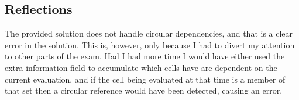 %
%

\subsection{Reflections}
The provided solution does not handle circular dependencies, and that is a
clear error in the solution. This is, however, only because I had to divert my
attention to other parts of the exam. Had I had more time I would have either
used the extra information field to accumulate which cells have are dependent
on the current evaluation, and if the cell being evaluated at that time is a
member of that set then a circular reference would have been detected, causing
an error.
